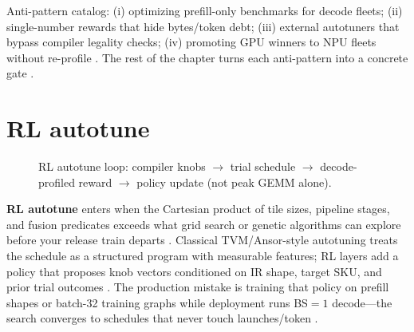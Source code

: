 Anti-pattern catalog: (i) optimizing prefill-only benchmarks for decode fleets; (ii) single-number rewards that hide bytes/token debt; (iii) external autotuners that bypass compiler legality checks; (iv) promoting GPU winners to NPU fleets without re-profile \citep{taxbreak2026,memoryfloor2026,amd2024xdna,amd2024aie,yirage2026,chen2020compilerbasedhardw,patel2025llminference,kwon2023vllm,liu2024deepseekv3,dlbook,semianalysis2024tma,dao2022flashattention,dao2023flashdecoding,nvidia2024cudagraphs,nvidia2022hopper}. The rest of the chapter turns each anti-pattern into a concrete gate \citep{yirage2026,chen2020compilerbasedhardw,memoryfloor2026,taxbreak2026,patel2025llminference,amd2024aie,dlbook}.

\section{RL autotune}
\label{sec:ch25_rl_autotune}


\begin{figure}[t]
\centering
{}
\caption{RL autotune loop: compiler knobs $\rightarrow$ trial schedule $\rightarrow$ decode-profiled reward $\rightarrow$ policy update (not peak GEMM alone).}
\label{fig:rl_autotune_pipeline}
\end{figure}

\textbf{RL autotune} enters when the Cartesian product of tile sizes, pipeline stages, and fusion predicates exceeds what grid search or genetic algorithms can explore before your release train departs \citep{chen2020compilerbasedhardw,dlbook}. Classical TVM/Ansor-style autotuning treats the schedule as a structured program with measurable features; RL layers add a policy that proposes knob vectors conditioned on IR shape, target SKU, and prior trial outcomes \citep{chen2020compilerbasedhardw,yirage2026}. The production mistake is training that policy on prefill shapes or batch-32 training graphs while deployment runs BS${=}1$ decode---the search converges to schedules that never touch launches/token \citep{taxbreak2026,memoryfloor2026,kwon2023vllm}.

